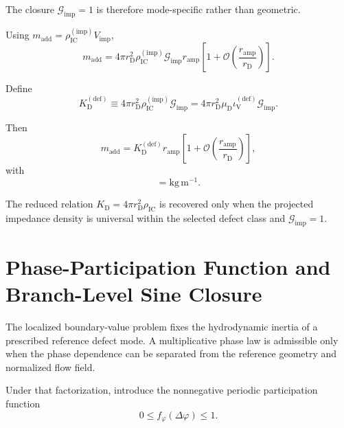 The closure $\mathcal{G}_{\mathrm{imp}}=1$ is therefore mode-specific rather than geometric.

Using $m_{\mathrm{add}}=\rho_{\mathrm{IC}}^{(\mathrm{imp})}V_{\mathrm{imp}}$,
\begin{equation}
    m_{\mathrm{add}}
    =
    4\pi r_{\mathrm{D}}^2
    \rho_{\mathrm{IC}}^{(\mathrm{imp})}
    \mathcal{G}_{\mathrm{imp}}
    r_{\mathrm{amp}}
    \left[
        1
        +
        \mathcal{O}
        \left(
            \frac{r_{\mathrm{amp}}}{r_{\mathrm{D}}}
        \right)
    \right].
\end{equation}

Define
\begin{equation}
    K_{\mathrm{D}}^{(\mathrm{def})}
    \equiv
    4\pi r_{\mathrm{D}}^2
    \rho_{\mathrm{IC}}^{(\mathrm{imp})}
    \mathcal{G}_{\mathrm{imp}}
    =
    4\pi r_{\mathrm{D}}^2
    \mu_{\mathrm{D}}
    \iota_{\mathrm{V}}^{(\mathrm{def})}
    \mathcal{G}_{\mathrm{imp}}.
\end{equation}

Then
\begin{equation}
    m_{\mathrm{add}}
    =
    K_{\mathrm{D}}^{(\mathrm{def})}
    r_{\mathrm{amp}}
    \left[
        1
        +
        \mathcal{O}
        \left(
            \frac{r_{\mathrm{amp}}}{r_{\mathrm{D}}}
        \right)
    \right],
\end{equation}
with
\begin{equation}
    [K_{\mathrm{D}}^{(\mathrm{def})}]
    =
    \mathrm{kg\,m^{-1}}.
\end{equation}

The reduced relation $K_{\mathrm{D}}=4\pi r_{\mathrm{D}}^2\rho_{\mathrm{IC}}$ is recovered only when the projected impedance density is universal within the selected defect class and $\mathcal{G}_{\mathrm{imp}}=1$.


\section{Phase-Participation Function and Branch-Level Sine Closure}
\label{sec:AP_phase_participation}

The localized boundary-value problem fixes the hydrodynamic inertia of a prescribed reference defect mode. A multiplicative phase law is admissible only when the phase dependence can be separated from the reference geometry and normalized flow field.

Under that factorization, introduce the nonnegative periodic participation function
\begin{equation}
    0
    \leq
    f_{\varphi}(\Delta\varphi)
    \leq
    1.
\end{equation}

